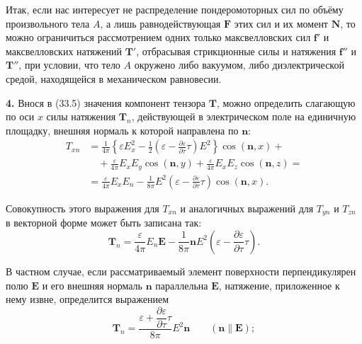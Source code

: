 \documentclass[a4paper,12pt]{article}
\begin{document}
Итак, если нас интересует не распределение пондеромоторных сил
по объёму произвольного тела $A$, а лишь равнодействующая $\mathbf{F}$
этих сил и их момент $\mathbf{N}$, то можно ограничиться рассмотрением
одних только максвелловских сил $\mathbf{f}'$ и максвелловских натяжений
$\mathbf{T}'$, отбрасывая стрикционные силы и натяжения $\mathbf{f}''$
и $\mathbf{T}''$, при условии, что тело $A$ окружено либо вакуумом,
либо диэлектрической средой, находящейся в механическом равновесии.

\textbf{4.} Внося в (33.5) значения компонент тензора $\mathbf{T}$,
можно определить слагающую по оси $x$ силы натяжения $\mathbf{T}_n$,
действующей в электрическом поле на единичную площадку, внешняя
нормаль к которой направлена по $\mathbf{n}$:
\begin{align*}
    T_{xn} &= \frac{1}{4\pi}\left\{\varepsilon E_x^2
            - \frac{1}{2}\left(\varepsilon - \frac{\partial\varepsilon}{\partial\tau}\tau\right)E^2
            \right\}\cos(\mathbf{n},x) + \\
           &\quad + \frac{\varepsilon}{4\pi}E_x E_y\cos(\mathbf{n},y)
            + \frac{\varepsilon}{4\pi}E_x E_z\cos(\mathbf{n},z) = \\
           &= \frac{\varepsilon}{4\pi}E_x E_n
            - \frac{1}{8\pi}E^2\!\left(\varepsilon
            - \frac{\partial\varepsilon}{\partial\tau}\tau\right)\cos(\mathbf{n},x).
\end{align*}


Совокупность этого выражения для $T_{xn}$ и аналогичных выражений
для $T_{yn}$ и $T_{zn}$ в векторной форме может быть записана так:
\begin{equation}
    \mathbf{T}_n = \frac{\varepsilon}{4\pi}E_n\mathbf{E}
                 - \frac{1}{8\pi}\mathbf{n}E^2\!\left(
                     \varepsilon - \frac{\partial\varepsilon}{\partial\tau}\tau
                   \right).
    \tag{34.5}
\end{equation}

В частном случае, если рассматриваемый элемент поверхности
перпендикулярен полю $\mathbf{E}$ и его внешняя нормаль $\mathbf{n}$
параллельна $\mathbf{E}$, натяжение, приложенное к нему извне,
определится выражением
\begin{equation}
    \mathbf{T}_n = \frac{\varepsilon + \dfrac{\partial\varepsilon}{\partial\tau}\tau}{8\pi}
                   E^2\mathbf{n}
    \qquad (\mathbf{n} \parallel \mathbf{E});
    \tag{34.6}
\end{equation}
\end{document}
